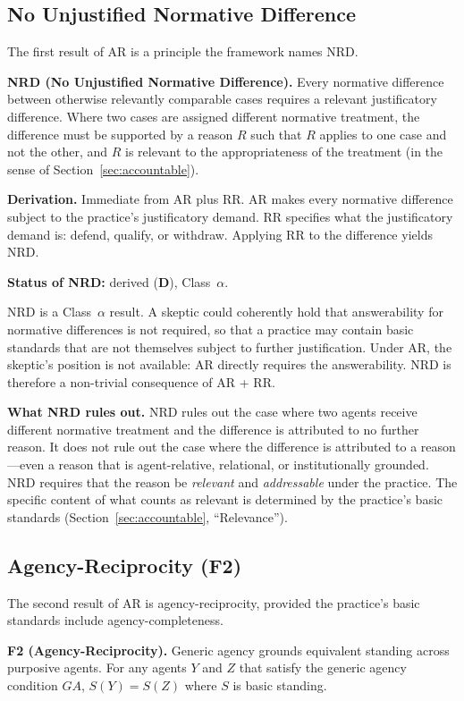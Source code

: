 \documentclass[11pt]{article}
\newcommand{\statusD}{\textcolor{stD}{\textbf{D}}}
\newcommand{\ca}{\texorpdfstring{Class~$\alpha$}{Class alpha}}
\begin{document}
\subsection{No Unjustified Normative Difference}
The first result of AR is a principle the framework names NRD.
\begin{paperbox}
\textbf{NRD (No Unjustified Normative Difference).} Every normative difference between otherwise relevantly comparable cases requires a relevant justificatory difference. Where two cases are assigned different normative treatment, the difference must be supported by a reason $R$ such that $R$ applies to one case and not the other, and $R$ is relevant to the appropriateness of the treatment (in the sense of Section~\ref{sec:accountable}).
\end{paperbox}

\textbf{Derivation.} Immediate from AR plus RR. AR makes every normative difference subject to the practice's justificatory demand. RR specifies what the justificatory demand is: defend, qualify, or withdraw. Applying RR to the difference yields NRD.

\textbf{Status of NRD:} derived (\statusD{}), \ca{}.

NRD is a \ca{} result. A skeptic could coherently hold that answerability for normative differences is not required, so that a practice may contain basic standards that are not themselves subject to further justification. Under AR, the skeptic's position is not available: AR directly requires the answerability. NRD is therefore a non-trivial consequence of AR + RR.

\textbf{What NRD rules out.} NRD rules out the case where two agents receive different normative treatment and the difference is attributed to no further reason. It does not rule out the case where the difference is attributed to a reason---even a reason that is agent-relative, relational, or institutionally grounded. NRD requires that the reason be \emph{relevant} and \emph{addressable} under the practice. The specific content of what counts as relevant is determined by the practice's basic standards (Section~\ref{sec:accountable}, ``Relevance'').

\subsection{Agency-Reciprocity (F2)}
The second result of AR is agency-reciprocity, provided the practice's basic standards include agency-completeness.
\begin{paperbox}
\textbf{F2 (Agency-Reciprocity).} Generic agency grounds equivalent standing across purposive agents. For any agents $Y$ and $Z$ that satisfy the generic agency condition $GA$, $S(Y) = S(Z)$ where $S$ is basic standing.
\end{paperbox}
\end{document}
